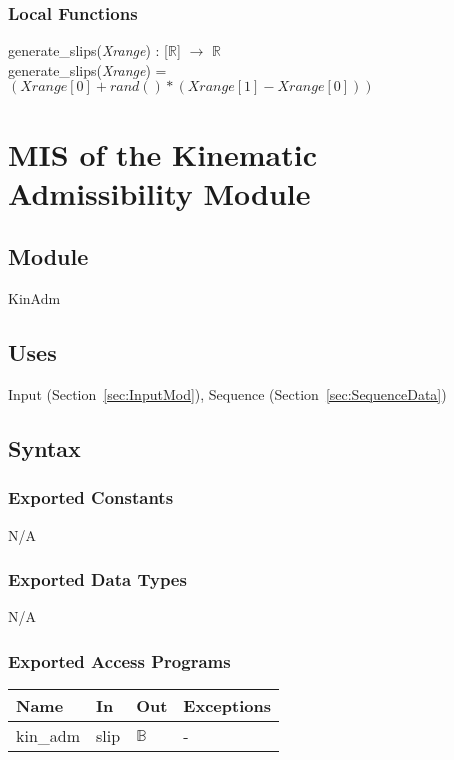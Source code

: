 \documentclass[12pt, titlepage]{article}
\begin{document}
\subsubsection{Local Functions}
generate\_slips(\textit{Xrange}) : [$\mathbb{R}$] $\rightarrow$ $\mathbb{R}$\\
generate\_slips(\textit{Xrange}) = $(Xrange[0] + rand()*(Xrange[1] - 
Xrange[0]))$


\newpage
\section{MIS of the Kinematic Admissibility
	Module} \label{sec:KinAdmMod}

\subsection{Module}
KinAdm

\subsection{Uses}
Input (Section~\ref{sec:InputMod}), Sequence (Section~\ref{sec:SequenceData})

\subsection{Syntax}

\subsubsection{Exported Constants}
N/A

\subsubsection{Exported Data Types}
N/A

\subsubsection{Exported Access Programs}

\begin{center}
	\renewcommand*{\arraystretch}{1.5}
	\begin{tabular} {p{}  p{}  p{} 
			p{} } \hline 
		\textbf{Name} & \textbf{In} & \textbf{Out} & \textbf{Exceptions} \\ 
		\hline
		
		kin\_adm & slip & $\mathbb{B}$ & - \\ \hline
		
	\end{tabular}
\end{center}
\end{document}
